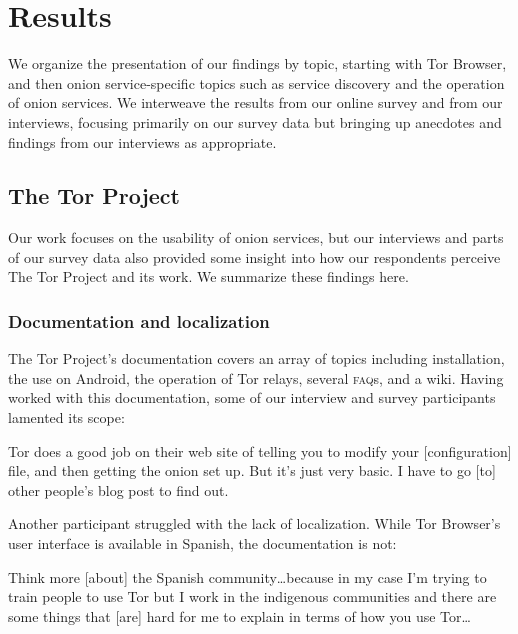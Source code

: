\section{Results}
\label{sec:results}

We organize the presentation of our findings by topic, starting with Tor
Browser, and then onion service-specific topics such as service discovery and
the operation of onion services.  We interweave the results from our online
survey and from our interviews, focusing primarily on our survey data but
bringing up anecdotes and findings from our interviews as appropriate.

\subsection{The Tor Project}

Our work focuses on the usability of onion services, but our interviews and parts
of our survey data also provided some insight into how our respondents perceive The Tor
Project and its work.  We summarize these findings here.

\subsubsection{Documentation and localization}

The Tor Project's documentation covers an array of topics including
installation, the use on Android, the operation of Tor relays, several
\textsc{faq}s, and a wiki.  Having worked with this documentation, some of our
interview and survey participants lamented its scope:

\begin{displayquote}[P14]
Tor does a good job on their web site of telling you to modify your
[configuration] file, and then getting the onion set up.  But it's just very
basic.  I have to go [to] other people's blog post to find out.
\end{displayquote}

Another participant struggled with the lack of localization.  While Tor
Browser's user interface is available in Spanish, the documentation is not:

\begin{displayquote}[P11]
Think more [about] the Spanish community\dots because in my case I'm trying to
train people to use Tor but I work in the indigenous communities and there are
some things that [are] hard for me to explain in terms of how you use Tor\dots
\end{displayquote}

